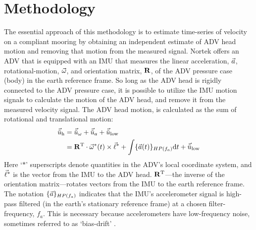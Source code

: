 
\section{Methodology}
\label{sec:methods}

\def\ue{\ensuremath{\vec{\tilde{u}}\earth}}


The essential approach of this methodology is to estimate time-series of velocity on a compliant mooring by obtaining an independent estimate of ADV head motion and removing that motion from the measured signal. Nortek offers an ADV that is equipped with an IMU that measures the linear acceleration, ${\vec{a}}$, rotational-motion, $\vec{\omega}$, and orientation matrix, $\mathbf{R}$, of the ADV pressure case (body) in the earth reference frame. So long as the ADV head is rigidly connected to the ADV pressure case, it is possible to utilize the IMU motion signals to calculate the motion of the ADV head, and remove it from the measured velocity signal.  The ADV head motion, is calculated as the sum of rotational and translational motion:
\begin{align}
  \label{eqn:uhead}
\begin{split}
  \uhead & = \urot + \uacc + \ulow \\
      & = \omatinv \cdot \AngRt^*(t)\times\l^* + \int \{\Accel(t)\}_{HP(f_{a})} \mathrm{d}t + \ulow
\end{split}
\end{align}
Here `$*$' superscripts denote quantities in the ADV's local coordinate system, and $\vec{\ell}^*$ is the vector from the IMU to the ADV head. $\mathbf{R}^\mathrm{T}$---the inverse of the orientation matrix---rotates vectors from the IMU to the earth reference frame. The notation $\{{\vec{a}}\}_{HP(f_a)}$ indicates that the IMU's accelerometer signal is high-pass filtered (in the earth's stationary reference frame) at a chosen filter-frequency, $f_a$. This is necessary because accelerometers have low-frequency noise, sometimes referred to as `bias-drift' \citep[]{Barshan1995,Bevly2004,Gulmammadov2009}. 

